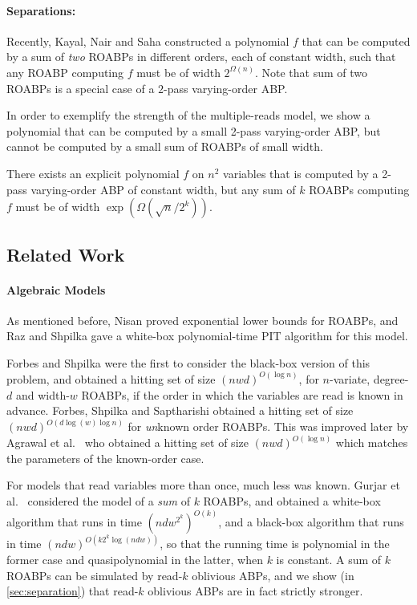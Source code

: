 \documentclass[11pt]{article}
\begin{document}
\paragraph{Separations:}
Recently, Kayal, Nair and Saha \cite{KNS15} constructed a polynomial $f$ that can be computed by a sum of {\em two} ROABPs in different orders, each of constant width, such that any ROABP computing $f$ must be of width $2^{\Omega(n)}$.
Note that sum of two ROABPs is a special case of a $2$-pass varying-order ABP.

In order to exemplify the strength of the multiple-reads model, we show a polynomial that can be computed by a small 2-pass varying-order ABP, but cannot be computed by a small sum of ROABPs of small width.

\begin{theorem}
\label{thm:intro:separation}
There exists an explicit polynomial $f$ on $n^2$ variables that is computed by a 2-pass varying-order ABP of constant width, but any sum of $k$ ROABPs computing $f$ must be of width $\exp(\Omega(\sqrt{n}/2^k))$.
\end{theorem}


\subsection{Related Work}
\label{sec:work}

\paragraph{Algebraic Models}

As mentioned before, Nisan \cite{nis91} proved exponential lower bounds for ROABPs, and Raz and Shpilka \cite{RS05} gave a white-box polynomial-time PIT algorithm for this model.

Forbes and Shpilka \cite{FS13} were the first to consider the black-box version of this problem, and obtained a hitting set of size $(nwd)^{O(\log n)}$, for $n$-variate, degree-$d$ and width-$w$ ROABPs, if the order in which the variables are read is known in advance.
Forbes, Shpilka and Saptharishi \cite{FSS14} obtained a hitting set of size $(nwd)^{O(d \log(w) \log n)}$ for {\em un}known order ROABPs.
This was improved later by Agrawal et al.\ \cite{agks15} who obtained a hitting set of size $(nwd)^{O(\log n)}$ which matches the parameters of the known-order case.

For models that read variables more than once, much less was known.
Gurjar et al.\ \cite{GKST15} considered the model of a {\em sum} of $k$ ROABPs, and obtained a white-box algorithm that runs in time $(ndw^{2^k})^{O(k)}$, and a black-box algorithm that runs in time $(ndw)^{O(k 2^k \log(ndw))}$, so that the running time is polynomial in the former case and quasipolynomial in the latter, when $k$ is constant.
A sum of $k$ ROABPs can be simulated by read-$k$ oblivious ABPs, and we show (in \autoref{sec:separation}) that read-$k$ oblivious ABPs are in fact strictly stronger.
\end{document}
